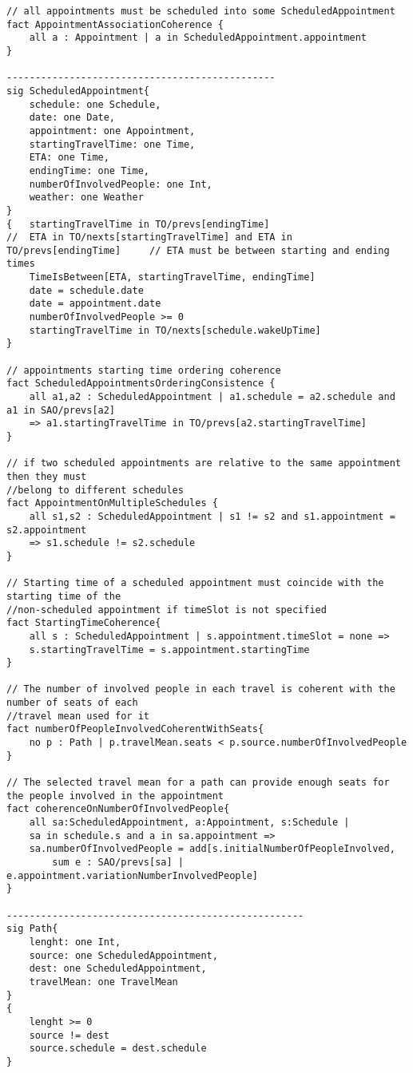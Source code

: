 \begin{lstlisting}
// all appointments must be scheduled into some ScheduledAppointment
fact AppointmentAssociationCoherence {
	all a : Appointment | a in ScheduledAppointment.appointment
}

-----------------------------------------------
sig ScheduledAppointment{
	schedule: one Schedule,
	date: one Date,
	appointment: one Appointment,
	startingTravelTime: one Time,
	ETA: one Time,
	endingTime: one Time,
	numberOfInvolvedPeople: one Int,
	weather: one Weather
}
{	startingTravelTime in TO/prevs[endingTime]
//	ETA in TO/nexts[startingTravelTime] and ETA in TO/prevs[endingTime]		// ETA must be between starting and ending times
	TimeIsBetween[ETA, startingTravelTime, endingTime]
	date = schedule.date																				
	date = appointment.date																			
	numberOfInvolvedPeople >= 0
	startingTravelTime in TO/nexts[schedule.wakeUpTime]
}

// appointments starting time ordering coherence
fact ScheduledAppointmentsOrderingConsistence {
	all a1,a2 : ScheduledAppointment | a1.schedule = a2.schedule and a1 in SAO/prevs[a2] 
	=> a1.startingTravelTime in TO/prevs[a2.startingTravelTime]
}

// if two scheduled appointments are relative to the same appointment then they must 
//belong to different schedules
fact AppointmentOnMultipleSchedules {
	all s1,s2 : ScheduledAppointment | s1 != s2 and s1.appointment = s2.appointment 
	=> s1.schedule != s2.schedule
}

// Starting time of a scheduled appointment must coincide with the starting time of the 
//non-scheduled appointment if timeSlot is not specified
fact StartingTimeCoherence{
	all s : ScheduledAppointment | s.appointment.timeSlot = none =>
	s.startingTravelTime = s.appointment.startingTime
}

// The number of involved people in each travel is coherent with the number of seats of each 
//travel mean used for it
fact numberOfPeopleInvolvedCoherentWithSeats{
	no p : Path | p.travelMean.seats < p.source.numberOfInvolvedPeople
}

// The selected travel mean for a path can provide enough seats for the people involved in the appointment
fact coherenceOnNumberOfInvolvedPeople{
	all sa:ScheduledAppointment, a:Appointment, s:Schedule | 
	sa in schedule.s and a in sa.appointment =>
	sa.numberOfInvolvedPeople = add[s.initialNumberOfPeopleInvolved,
		sum e : SAO/prevs[sa] | e.appointment.variationNumberInvolvedPeople]
}

----------------------------------------------------
sig Path{
	lenght: one Int,
	source: one ScheduledAppointment,
	dest: one ScheduledAppointment,
	travelMean: one TravelMean
}
{
	lenght >= 0
	source != dest
	source.schedule = dest.schedule
}


\end{lstlisting}
